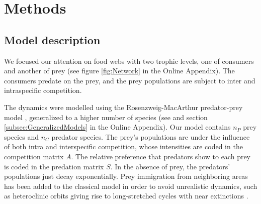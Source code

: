 \section{Methods}
\label{sec:Methods}

\subsection{Model description}
\label{subsec:Model}

We focused our attention on food webs with two trophic levels, one of consumers and another of prey (see figure \ref{fig:Network} in the Online Appendix). The consumers predate on the prey, and the prey populations are subject to inter and intraspecific competition.

The dynamics were modelled using the Rosenzweig-MacArthur predator-prey model \citep{Rosenzweig1963}, generalized to a higher number of species (see \citet{Scheffer2004} and section \ref{subsec:GeneralizedModels} in the Online Appendix). Our model contains $n_P$ prey species and $n_C$ predator species. The prey's populations are under the influence of both intra and interspecific competition, whose intensities are coded in the competition matrix $A$. The relative preference that predators show to each prey is coded in the predation matrix $S$. In the absence of prey, the predators' populations just decay exponentially. Prey immigration from neighboring areas has been added to the classical model in order to avoid unrealistic dynamics, such as heteroclinic orbits giving rise to long-stretched cycles with near extinctions \citep{Scheffer2004}.

